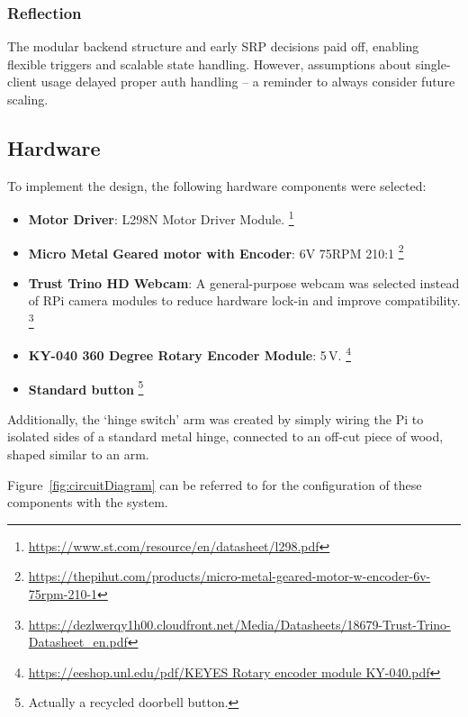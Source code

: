             \subsubsection*{Reflection}
                The modular backend structure and early SRP decisions paid off, enabling flexible triggers and scalable state handling. However, assumptions about single-client usage delayed proper auth handling -- a reminder to always consider future scaling.
    
        \subsection{Hardware}
    
            To implement the design, the following hardware components were selected:
    
            \begin{itemize}
                \item \textbf{Motor Driver}: L298N Motor Driver Module. \footnote{\url{https://www.st.com/resource/en/datasheet/l298.pdf}}
    
                \item \textbf{Micro Metal Geared motor with Encoder}: 6V 75RPM 210:1 \footnote{\url{https://thepihut.com/products/micro-metal-geared-motor-w-encoder-6v-75rpm-210-1}}
    
                \item \textbf{Trust Trino HD Webcam}: A general-purpose webcam was selected instead of RPi camera modules to reduce hardware lock-in and improve compatibility. \footnote{\url{https://dezlwerqy1h00.cloudfront.net/Media/Datasheets/18679-Trust-Trino-Datasheet_en.pdf}}
    
                \item \textbf{KY-040 360 Degree Rotary Encoder Module}: 5\,V. \footnote{\url{https://eeshop.unl.edu/pdf/KEYES Rotary encoder module KY-040.pdf}}
    
                \item \textbf{Standard button} \footnote{Actually a recycled doorbell button.}
            \end{itemize}
    
            Additionally, the `hinge switch' arm was created by simply wiring the Pi to isolated sides of a standard metal hinge, connected to an off-cut piece of wood, shaped similar to an arm.
    
            Figure~\ref{fig:circuitDiagram} can be referred to for the configuration of these components with the system.
    
